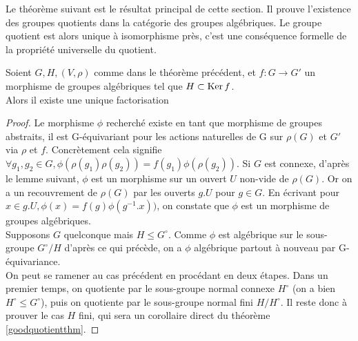 Le théorème suivant est le résultat principal de cette section. Il prouve l'existence des groupes quotients dans la catégorie des groupes algébriques. Le groupe quotient est alors unique à isomorphisme près, c'est une conséquence formelle de la propriété universelle du quotient.

\begin{thm}[Car. 0]\label{groupequotient}
Soient $G, H, (V, \rho)$ comme dans le théorème précédent, et $f:G \rightarrow G'$ un morphisme de groupes algébriques tel que $H\subset \operatorname{Ker} f$.\\
Alors il existe une unique factorisation 	
\end{thm}
\begin{proof}
	Le morphisme $\phi$ recherché existe en tant que morphisme de groupes abstraits, il est G-équivariant pour les actions naturelles de G sur $\rho(G)$ et $G'$ via $\rho$ et $f$. Concrètement cela signifie $\forall g_1, g_2 \in G, \phi(\rho(g_1)\rho(g_2))=f(g_1)\phi(\rho(g_2))$. Si $G$ est connexe, d'après le lemme suivant, $\phi$ est un morphisme sur un ouvert $U$ non-vide de $\rho(G)$. Or on a un recouvrement de $\rho(G)$ par les ouverts $g.U$ pour $g\in G$. En écrivant pour $x\in g.U,  \phi(x)=f(g)\phi(g^{-1}.x))$, on constate que $\phi$ est un morphisme de groupes algébriques.
	\\Supposons $G$ quelconque mais $H\leq G^\circ$. Comme $\phi$ est algébrique sur le sous-groupe $G^\circ/H$ d'après ce qui précède, on a $\phi$ algébrique partout à nouveau par G-équivariance.\\
	On peut se ramener au cas précédent en procédant en deux étapes. Dans un premier temps, on quotiente par le sous-groupe normal connexe $H^\circ$ (on a bien $H^\circ\leq G^\circ$), puis on quotiente par le sous-groupe normal fini $H/H^\circ$. Il reste donc à prouver le cas $H$ fini, qui sera un corollaire direct du théorème \ref{goodquotientthm}.
\end{proof}

